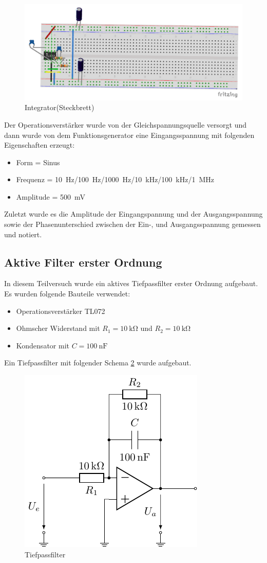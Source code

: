 \begin{figure}[H]
  \centering
  \includegraphics[width=0.4\linewidth]{Elektronik-Laborprotokoll_Filter/Abbildungen/Steckbrett_Bilder/Steckbrett_invertierender_Integrator.pdf}
  \caption{Integrator(Steckbrett)}
  \label{fig:Steckbrett_Integrator}
\end{figure}

  Der Operationsverstärker wurde von der Gleichspannungsquelle versorgt und dann wurde von dem Funktionsgenerator eine Eingangsspannung mit folgenden Eigenschaften erzeugt:
   
\begin{itemize}
    \item Form = Sinus 
    \item Frequenz = \SI{10}{\hertz}/\SI{100}{\hertz}/\SI{1000}{\hertz}/\SI{10}{\kilo\hertz}/\SI{100}{\kilo\hertz}/\SI{1}{\mega\hertz}
    \item Amplitude = \SI{500}{\milli\volt}
\end{itemize}
Zuletzt wurde es die Amplitude der Eingangspannung und der Ausgangsspannung sowie der Phasenunterschied zwischen der Ein-, und Ausgangsspannung gemessen und notiert.


\subsection{Aktive Filter erster Ordnung}

In diesem Teilversuch wurde ein aktives Tiefpassfilter erster Ordnung aufgebaut.
Es wurden folgende Bauteile verwendet:
%
\begin{itemize}
\item Operationsverstärker TL072
    \item Ohmscher Widerstand mit $R_1=\SI{10}{\kilo\ohm}$ und $R_2=\SI{10}{\kilo\ohm}$
    \item Kondensator mit $C=\SI{100}{\nano\farad}$
\end{itemize}
%
Ein Tiefpassfilter mit folgender Schema \ref{fig:circuit_Tiefpass} wurde aufgebaut.


\begin{figure}[H]
  \centering
  \includegraphics[width=0.4\linewidth]{Elektronik-Laborprotokoll_Filter/Circuits/Tiefpass.pdf}
  \caption{Tiefpassfilter}
  \label{fig:circuit_Tiefpass}
\end{figure}

